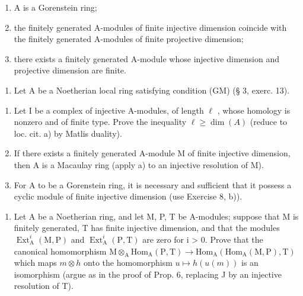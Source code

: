 \begin{enumerate}
\def\labelenumi{(\roman{enumi})}
\item
  A is a Gorenstein ring;
\item
  the finitely generated A-modules of finite injective dimension coincide with the finitely generated A-modules of finite projective dimension;
\item
  there exists a finitely generated A-module whose injective dimension and projective dimension are finite.
\end{enumerate}

\begin{enumerate}
\def\labelenumi{\arabic{enumi})}
\setcounter{enumi}{8}
\tightlist
\item
  Let A be a Noetherian local ring satisfying condition (GM) (§ 3, exerc. 13).
\end{enumerate}

\begin{enumerate}
\def\labelenumi{\alph{enumi})}
\item
  Let I be a complex of injective A-modules, of length \(\ell\) , whose homology is nonzero and of finite type. Prove the inequality \(\ell \geqslant \dim(A)\) (reduce to loc. cit. a) by Matlis duality).
\item
  If there exists a finitely generated A-module M of finite injective dimension, then A is a Macaulay ring (apply a) to an injective resolution of M).
\item
  For A to be a Gorenstein ring, it is necessary and sufficient that it possess a cyclic module of finite injective dimension (use Exercise 8, b)).
\end{enumerate}

\begin{enumerate}
\def\labelenumi{\arabic{enumi})}
\setcounter{enumi}{9}
\tightlist
\item
  Let A be a Noetherian ring, and let M, P, T be A-modules; suppose that M is finitely generated, T has finite injective dimension, and that the modules \(\operatorname{Ext}_{\mathrm{A}}^{i}(\mathrm{M},\mathrm{P})\) and \(\operatorname{Ext}_{\mathrm{A}}^{i}(\mathrm{P},\mathrm{T})\) are zero for i \textgreater{} 0. Prove that the canonical homomorphism \(\mathrm{M}\otimes_{\mathrm{A}}\mathrm{Hom}_{\mathrm{A}}(\mathrm{P},\mathrm{T})\to\mathrm{Hom}_{\mathrm{A}}(\mathrm{Hom}_{\mathrm{A}}(\mathrm{M},\mathrm{P}),\mathrm{T})\) which maps \(m\otimes h\) onto the homomorphism \(u\mapsto h(u(m))\) is an isomorphism (argue as in the proof of Prop. 6, replacing J by an injective resolution of T).
\end{enumerate}

